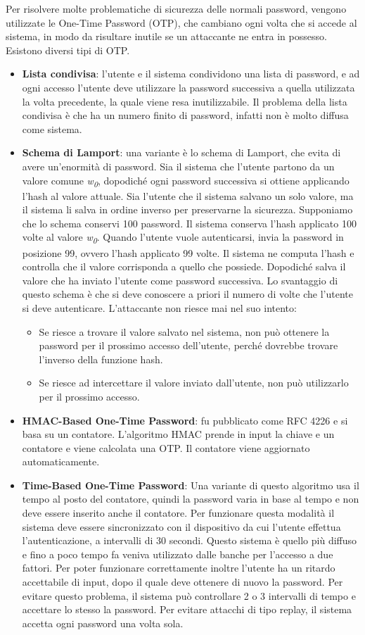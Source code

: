 Per risolvere molte problematiche di sicurezza delle normali password, vengono utilizzate le One-Time Password (OTP), che cambiano ogni volta che si accede al sistema, in modo da risultare inutile se un attaccante ne entra in possesso. Esistono diversi tipi di OTP.
\begin{itemize}
    \item \textbf{Lista condivisa}: l'utente e il sistema condividono una lista di password, e ad ogni accesso l'utente deve utilizzare la password successiva a quella utilizzata la volta precedente, la quale viene resa inutilizzabile. Il problema della lista condivisa è che ha un numero finito di password, infatti non è molto diffusa come sistema.
    \item \textbf{Schema di Lamport}: una variante è lo schema di Lamport, che evita di avere un'enormità di password. Sia il sistema che l'utente partono da un valore comune \textit{w\textsubscript{0}}, dopodiché ogni password successiva si ottiene applicando l'hash al valore attuale. Sia l'utente che il sistema salvano un solo valore, ma il sistema li salva in ordine inverso per preservarne la sicurezza. Supponiamo che lo schema conservi 100 password. Il sistema conserva l'hash applicato 100 volte al valore \textit{w\textsubscript{0}}. Quando l'utente vuole autenticarsi, invia la password in posizione 99, ovvero l'hash applicato 99 volte. Il sistema ne computa l'hash e controlla che il valore corrisponda a quello che possiede. Dopodiché salva il valore che ha inviato l'utente come password successiva. Lo svantaggio di questo schema è che si deve conoscere a priori il numero di volte che l'utente si deve autenticare. L'attaccante non riesce mai nel suo intento:
    \begin{itemize}
        \item Se riesce a trovare il valore salvato nel sistema, non può ottenere la password per il prossimo accesso dell'utente, perché dovrebbe trovare l'inverso della funzione hash.
        \item Se riesce ad intercettare il valore inviato dall'utente, non può utilizzarlo per il prossimo accesso.
    \end{itemize}
    \item \textbf{HMAC-Based One-Time Password}: fu pubblicato come RFC 4226 e si basa su un contatore. L'algoritmo HMAC prende in input la chiave e un contatore e viene calcolata una OTP. Il contatore viene aggiornato automaticamente. 
    \item \textbf{Time-Based One-Time Password}: Una variante di questo algoritmo usa il tempo al posto del contatore, quindi la password varia in base al tempo e non deve essere inserito anche il contatore. Per funzionare questa modalità il sistema deve essere sincronizzato con il dispositivo da cui l'utente effettua l'autenticazione, a intervalli di 30 secondi. Questo sistema è quello più diffuso e fino a poco tempo fa veniva utilizzato dalle banche per l'accesso a due fattori. Per poter funzionare correttamente inoltre l'utente ha un ritardo accettabile di input, dopo il quale deve ottenere di nuovo la password. Per evitare questo problema, il sistema può controllare 2 o 3 intervalli di tempo e accettare lo stesso la password. Per evitare attacchi di tipo replay, il sistema accetta ogni password una volta sola. 

\end{itemize}
